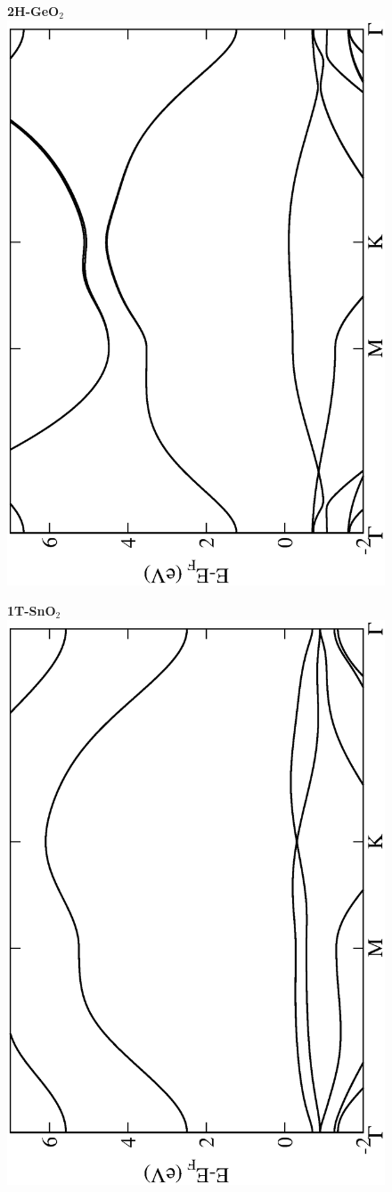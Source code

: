 \begin{figure}[htbp]
\centering
{\bfseries \sffamily 2H-GeO$_{2}$}\\
\includegraphics[width=0.45\linewidth, angle=-90, trim={2.9cm, 0cm, 2cm, 0cm}, clip]{img/SI_figs/BS/2H-GeO2.eps}
\end{figure}

\begin{figure}[htbp]
\centering
{\bfseries \sffamily 1T-SnO$_{2}$}\\
\includegraphics[width=0.45\linewidth, angle=-90, trim={2.9cm, 0cm, 2cm, 0cm}, clip]{img/SI_figs/BS/1T-SnO2.eps}
\end{figure}

